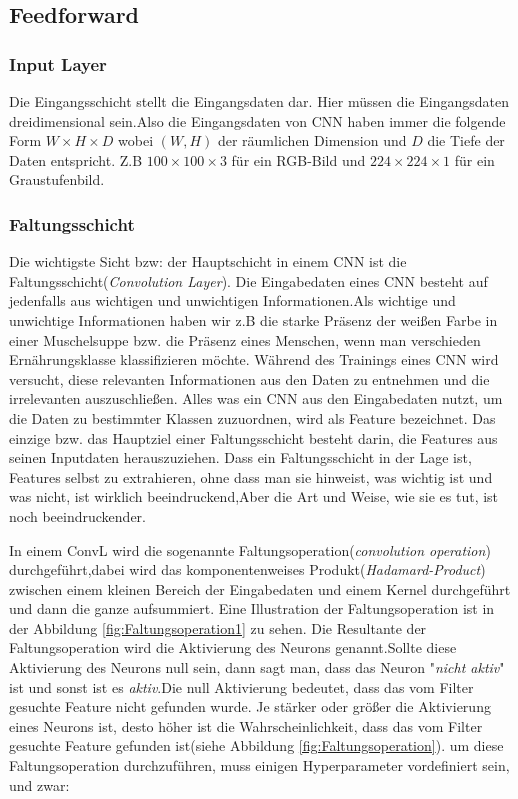 \documentclass[12pt,a4paper]{scrartcl}
\makeatletter
\numberwithin{equation}{section}
\renewcommand\paragraph{\@startsection{paragraph}{4}{\z@}%
	{-2.5ex\@plus -1ex \@minus -.25ex}%
	{1.25ex \@plus .25ex}%
	{\normalfont\normalsize\bfseries}}
\makeatother
\begin{document}
\subsection{Feedforward }
\subsubsection{Input Layer}\label{InputLayer}
Die Eingangsschicht stellt die Eingangsdaten dar. Hier müssen die Eingangsdaten dreidimensional sein.Also die Eingangsdaten von \ac{CNN}  haben immer die folgende Form $ W\times H\times D $ wobei $ (W, H) $ der räumlichen Dimension und $ D $ die Tiefe der Daten entspricht. Z.B  $ 100\times100 \times3 $ für ein RGB-Bild und $ 224\times224\times1 $ für ein Graustufenbild.


\subsubsection{Faltungsschicht}\label{ConvL}
Die wichtigste Sicht bzw: der Hauptschicht in einem \ac{CNN} ist die Faltungsschicht(\emph{Convolution Layer}).
Die Eingabedaten eines \ac{CNN} besteht auf jedenfalls aus wichtigen und unwichtigen Informationen.Als wichtige und unwichtige Informationen haben wir z.B die starke Präsenz der weißen Farbe in einer Muschelsuppe bzw. die Präsenz eines Menschen, wenn man verschieden Ernährungsklasse klassifizieren möchte. Während des Trainings eines \ac{CNN} wird versucht, diese relevanten Informationen aus den Daten zu entnehmen und die irrelevanten auszuschließen. Alles was ein \ac{CNN} aus den Eingabedaten nutzt, um die Daten zu bestimmter Klassen zuzuordnen, wird als Feature bezeichnet.
Das einzige bzw. das Hauptziel einer Faltungsschicht besteht darin, die Features aus seinen Inputdaten herauszuziehen.
Dass ein Faltungsschicht in der Lage ist, Features selbst zu extrahieren, ohne dass man sie hinweist, was wichtig ist und was nicht, ist wirklich beeindruckend,Aber die Art und Weise, wie sie es tut, ist noch beeindruckender.

In einem \ac{ConvL} wird die sogenannte Faltungsoperation(\emph{convolution operation}) durchgeführt,dabei wird das komponentenweises Produkt(\textit{Hadamard-Product}) zwischen einem kleinen Bereich der Eingabedaten und einem Kernel durchgeführt und dann die ganze aufsummiert. Eine Illustration der Faltungsoperation ist in der Abbildung \ref{fig:Faltungsoperation1} zu sehen. Die Resultante der Faltungsoperation wird die Aktivierung des Neurons genannt.Sollte diese Aktivierung des Neurons null sein, dann sagt man, dass das Neuron "\textit{nicht aktiv}"{} ist und sonst ist es \textit{aktiv}.Die null Aktivierung bedeutet, dass das vom Filter gesuchte Feature nicht gefunden wurde. Je stärker oder größer die Aktivierung eines Neurons ist, desto höher ist die Wahrscheinlichkeit, dass das vom Filter gesuchte Feature gefunden ist(siehe Abbildung \ref{fig:Faltungsoperation}).
um diese Faltungsoperation durchzuführen, muss einigen Hyperparameter vordefiniert sein, und zwar:
\end{document}
